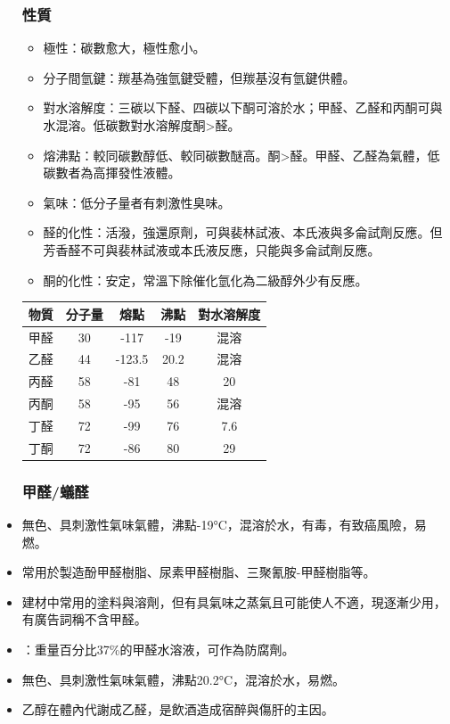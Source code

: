 \documentclass[a4paper,12pt]{report}
\begin{document}
\begin{itemize}
\subsubsection{性質}
\begin{itemize}
\item 極性：碳數愈大，極性愈小。
\item 分子間氫鍵：羰基為強氫鍵受體，但羰基沒有氫鍵供體。
\item 對水溶解度：三碳以下醛、四碳以下酮可溶於水；甲醛、乙醛和丙酮可與水混溶。低碳數對水溶解度酮>醛。
\item 熔沸點：較同碳數醇低、較同碳數醚高。酮>醛。甲醛、乙醛為氣體，低碳數者為高揮發性液體。
\item 氣味：低分子量者有刺激性臭味。
\item 醛的化性：活潑，強還原劑，可與裴林試液、本氏液與多侖試劑反應。但芳香醛不可與裴林試液或本氏液反應，只能與多侖試劑反應。
\item 酮的化性：安定，常溫下除催化氫化為二級醇外少有反應。
\end{itemize}
\begin{longtable}[c]{|c|c|c|c|c|}
\hline
物質 & 分子量 & 熔點 & 沸點 & 對水溶解度\\\hline
甲醛 & 30 & -117 & -19 & 混溶\\\hline
乙醛 & 44 & -123.5 & 20.2 & 混溶\\\hline
丙醛 & 58 & -81 & 48 & 20\\\hline
丙酮 & 58 & -95 & 56 & 混溶\\\hline
丁醛 & 72 & -99 & 76 & 7.6\\\hline
丁酮 & 72 & -86 & 80 & 29\\\hline
\end{longtable}
\subsubsection{甲醛/蟻醛}
\bit
\item 無色、具刺激性氣味氣體，沸點-19°C，混溶於水，有毒，有致癌風險，易燃。
\item 常用於製造酚甲醛樹脂、尿素甲醛樹脂、三聚氰胺-甲醛樹脂等。
\item 建材中常用的塗料與溶劑，但有具氣味之蒸氣且可能使人不適，現逐漸少用，有廣告詞稱不含甲醛。
\item {}：重量百分比37\%的甲醛水溶液，可作為防腐劑。
\eit
{}
\bit
\item 無色、具刺激性氣味氣體，沸點20.2°C，混溶於水，易燃。
\item 乙醇在體內代謝成乙醛，是飲酒造成宿醉與傷肝的主因。
\eit

\end{itemize}
\end{document}
